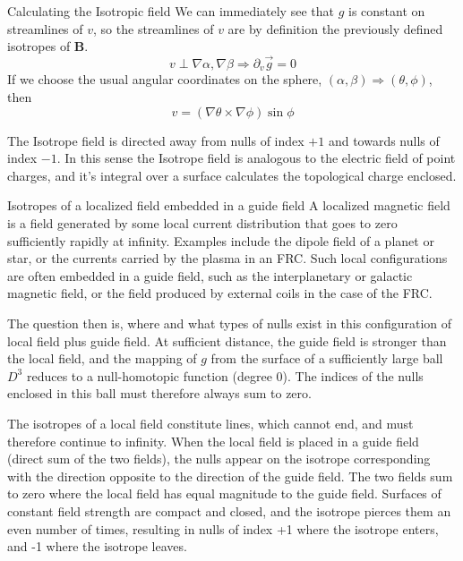 \documentclass[final]{beamer}
\newlength{\onecolwid}
\begin{document}
\begin{frame}[t]
\begin{columns}[t]
\begin{column}{\onecolwid}
\begin{block}{Calculating the Isotropic field}
We can immediately see that $g$ is constant on streamlines of $v$, so the streamlines of $v$ are by definition the previously defined isotropes of $\mathbf{B}$.
	\begin{equation}
		v\perp\nabla\alpha,\nabla\beta\Rightarrow\partial_v\vec g=0
	\end{equation}
If we choose the usual angular coordinates on the sphere, $(\alpha,\beta)\Rightarrow(\theta,\phi)$, then
	\begin{equation}
		v=(\nabla\theta\times\nabla\phi)\sin\phi
	\end{equation}

    The Isotrope field is directed away from nulls of index $+1$ and towards nulls of
    index $-1$.
    In this sense the Isotrope field is analogous to the electric field of  point charges, and it's
    integral over a surface calculates the topological charge enclosed.



\end{block}

\begin{block}{Isotropes of a localized field embedded in a guide field}
    A localized magnetic field is a field generated by some local current distribution
    that goes to zero sufficiently rapidly at infinity. 
    Examples include the dipole field of a planet or star, or the currents carried by the
    plasma in an FRC. 
    Such local configurations are often embedded in a guide field, such as the
    interplanetary or galactic magnetic field, or the field produced by external coils in
    the case of the FRC. 

    The question then is, where and what types of nulls exist in this configuration of
    local field plus guide field. 
    At sufficient distance, the guide field is stronger than the local field, and the
    mapping of $g$ from the surface of a sufficiently large ball $D^3$ reduces to a null-homotopic
    function (degree 0).
    The indices of the nulls enclosed in this ball must therefore always sum to zero. 

    The isotropes of a local field
    constitute lines, which cannot end, and must therefore continue to infinity. 
    When the local field is placed in a guide field (direct sum of the two fields), the
    nulls appear on the isotrope corresponding with the direction opposite to the
    direction of the guide field. 
    The two fields sum to zero where the local field has equal magnitude to the guide
    field. 
    Surfaces of constant field strength are compact and closed, and the isotrope pierces
    them an even number of times, resulting in nulls of index +1 where the isotrope
    enters, and -1 where the isotrope leaves. 
    





\end{block}
\end{column}
\end{columns}
\end{frame}
\end{document}
